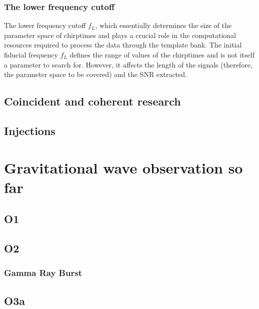 \documentclass[binding=0.6cm, LaM]{sapthesis}
\begin{document}
\subsection{The lower frequency cutoff}

	The lower frequency cutoff $f_L$, which essentially determines the size of the parameter space 
	of chirptimes and plays a crucial role in the computational resources required 
	to process the data through the template bank. 
	The initial fiducial frequency $f_L$ defines the range of values of the chirptimes 
	and is not itself a parameter to search for. 
	However, it affects the length of the signals 
	(therefore, the parameter space to be covered) and the SNR extracted. 

\section{Coincident and coherent research}

\section{Injections}

\chapter{Gravitational wave observation so far}

\section{O1}

\section{O2}

\subsection{Gamma Ray Burst}

\section{O3a}
\end{document}
